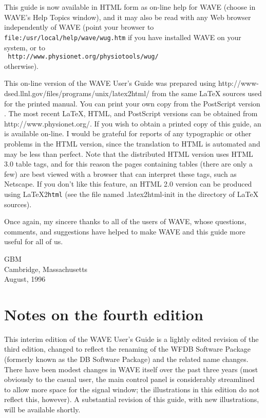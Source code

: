 \documentclass[twoside]{book}
\newcommand{\button}[1]{\cornersize{2}\ovalbox{\rule[-.3mm]{0cm}{2.5mm}\small\sf ~#1~}}
\newcommand{\WAVE}{{\sf WAVE}\xspace}
\begin{document}
\begin{latexonly}
This guide is now available in HTML form as on-line help for \WAVE{}
(choose \button{User's Guide} in \WAVE{}'s {\sf Help Topics} window),
and it may also be read with any Web browser independently of \WAVE{}
(point your browser to {\tt
file:\-/usr\-/local\-/help\-/wave\-/wug.htm} if you 
have installed \WAVE{} on your system, or to\\
{\tt
http://www.physionet.org\-/physiotools\-/wug/}\\
otherwise). 
\end{latexonly}
\begin{htmlonly}
This on-line version of the \WAVE{} User's Guide was prepared using
{http://www-dsed.llnl.gov/files/programs/unix/latex2html/}
from the same \LaTeX{} sources used for the
printed manual.  You can print your own copy from the PostScript version
.  The most recent \LaTeX{}, HTML, and
PostScript versions can be obtained from
{http://www.physionet.org/}.  If you wish to obtain a printed copy of
this guide, an
is available on-line.
I would be grateful for reports of any typographic or other problems
in the HTML version, since the translation to HTML is automated and
may be less than perfect.  Note that the distributed HTML version uses
HTML 3.0 table tags, and for this reason the pages containing tables
(there are only a few) are best viewed with a browser that can
interpret these tags, such as Netscape.  If you don't like this
feature, an HTML 2.0 version can be produced using \LaTeX 2\texttt{html}
(see the file named {.latex2html-init} in the directory of \LaTeX{}
sources).
\end{htmlonly}

Once again, my sincere thanks to all of the users of \WAVE{}, whose questions,
comments, and suggestions have helped to make \WAVE{} and this guide
more useful for all of us.

\vspace{2em}
\noindent
GBM\\
Cambridge, Massachusetts\\
August, 1996

\section*{Notes on the fourth edition}

This interim edition of the \WAVE{} User's Guide is a lightly edited
revision of the third edition, changed to reflect the renaming of the
WFDB Software Package (formerly known as the DB Software Package) and
the related name changes.  There have been modest changes in \WAVE{}
itself over the past three years (most obviously to the casual user,
the main control panel is considerably streamlined to allow more space
for the signal window;  the illustrations in this edition do not
reflect this, however).  A substantial revision of this
guide, with new illustrations, will be available shortly.
\end{document}
